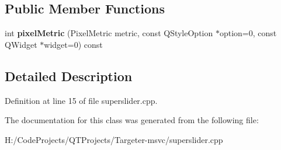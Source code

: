 \subsection*{Public Member Functions}
\begin{DoxyCompactItemize}
\item 
\mbox{\label{class_slider_proxy_a351faed6a290f643fb744e5447cf6b34}} 
int {\bfseries pixel\+Metric} (Pixel\+Metric metric, const Q\+Style\+Option $\ast$option=0, const Q\+Widget $\ast$widget=0) const
\end{DoxyCompactItemize}


\subsection{Detailed Description}


Definition at line 15 of file superslider.\+cpp.



The documentation for this class was generated from the following file\+:\begin{DoxyCompactItemize}
\item 
H\+:/\+Code\+Projects/\+Q\+T\+Projects/\+Targeter-\/msvc/superslider.\+cpp\end{DoxyCompactItemize}
